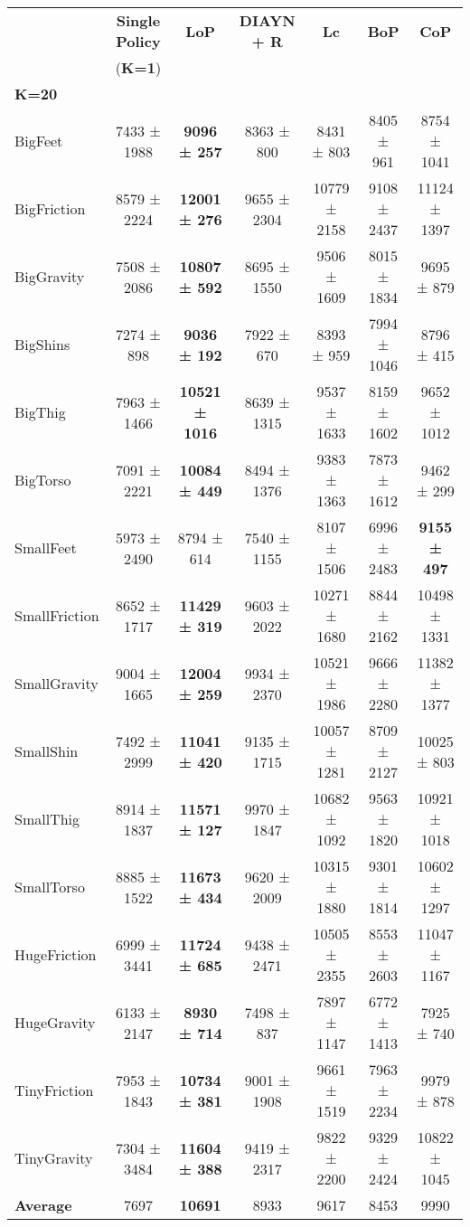 \scriptsize{}
\begin{tabular}{l|c|c|c|c|c|c}
 &\textbf{Single Policy} &\textbf{LoP} &\textbf{DIAYN + R} &\textbf{Lc} &\textbf{BoP} &\textbf{CoP} \\ 
 & (\textbf{K=1}) & & & & &\\ \midrule
 \textbf{K=20}& & & & & \\
BigFeet &7433 ± 1988 &\textbf{9096 ± 257} &8363 ± 800 &8431 ± 803 &8405 ± 961 &8754 ± 1041 \\
BigFriction &8579 ± 2224 &\textbf{12001 ± 276} &9655 ± 2304 &10779 ± 2158 &9108 ± 2437 &11124 ± 1397 \\
BigGravity &7508 ± 2086 &\textbf{10807 ± 592} &8695 ± 1550 &9506 ± 1609 &8015 ± 1834 &9695 ± 879 \\
BigShins &7274 ± 898 &\textbf{9036 ± 192} &7922 ± 670 &8393 ± 959 &7994 ± 1046 &8796 ± 415 \\
BigThig &7963 ± 1466 &\textbf{10521 ± 1016} &8639 ± 1315 &9537 ± 1633 &8159 ± 1602 &9652 ± 1012 \\
BigTorso &7091 ± 2221 &\textbf{10084 ± 449} &8494 ± 1376 &9383 ± 1363 &7873 ± 1612 &9462 ± 299 \\
SmallFeet &5973 ± 2490 &8794 ± 614 &7540 ± 1155 &8107 ± 1506 &6996 ± 2483 &\textbf{9155 ± 497} \\
SmallFriction &8652 ± 1717 &\textbf{11429 ± 319} &9603 ± 2022 &10271 ± 1680 &8844 ± 2162 &10498 ± 1331 \\
SmallGravity &9004 ± 1665 &\textbf{12004 ± 259} &9934 ± 2370 &10521 ± 1986 &9666 ± 2280 &11382 ± 1377 \\
SmallShin &7492 ± 2999 &\textbf{11041 ± 420} &9135 ± 1715 &10057 ± 1281 &8709 ± 2127 &10025 ± 803 \\
SmallThig &8914 ± 1837 &\textbf{11571 ± 127} &9970 ± 1847 &10682 ± 1092 &9563 ± 1820 &10921 ± 1018 \\
SmallTorso &8885 ± 1522 &\textbf{11673 ± 434} &9620 ± 2009 &10315 ± 1880 &9301 ± 1814 &10602 ± 1297 \\
HugeFriction &6999 ± 3441 &\textbf{11724 ± 685} &9438 ± 2471 &10505 ± 2355 &8553 ± 2603 &11047 ± 1167 \\
HugeGravity &6133 ± 2147 &\textbf{8930 ± 714} &7498 ± 837 &7897 ± 1147 &6772 ± 1413 &7925 ± 740 \\
TinyFriction &7953 ± 1843 &\textbf{10734 ± 381} &9001 ± 1908 &9661 ± 1519 &7963 ± 2234 &9979 ± 878 \\
TinyGravity &7304 ± 3484 &\textbf{11604 ± 388} &9419 ± 2317 &9822 ± 2200 &9329 ± 2424 &10822 ± 1045 \\\bottomrule
\textbf{Average} &7697 &\textbf{10691} &8933 &9617 &8453 &9990 \\
\end{tabular}
\vspace{0.5cm}
